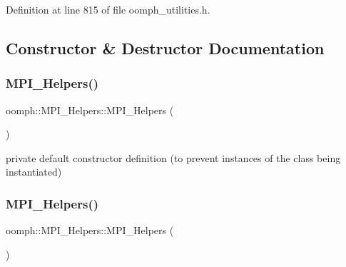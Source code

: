 Definition at line 815 of file oomph\+\_\+utilities.\+h.



\subsection{Constructor \& Destructor Documentation}
\mbox{\label{classoomph_1_1MPI__Helpers_afb01ddfbe038936ec832cdbea6e677e8}} 
\subsubsection{\texorpdfstring{M\+P\+I\+\_\+\+Helpers()}{MPI\_Helpers()}\hspace{0.1cm}{\footnotesize\ttfamily [1/2]}}
{\footnotesize\ttfamily oomph\+::\+M\+P\+I\+\_\+\+Helpers\+::\+M\+P\+I\+\_\+\+Helpers (\begin{DoxyParamCaption}{ }\end{DoxyParamCaption})\hspace{0.3cm}{\ttfamily [private]}}



private default constructor definition (to prevent instances of the class being instantiated) 

\mbox{\label{classoomph_1_1MPI__Helpers_acf521b68d094e6a88a8bf14f8ebe3185}} 
\subsubsection{\texorpdfstring{M\+P\+I\+\_\+\+Helpers()}{MPI\_Helpers()}\hspace{0.1cm}{\footnotesize\ttfamily [2/2]}}
{\footnotesize\ttfamily oomph\+::\+M\+P\+I\+\_\+\+Helpers\+::\+M\+P\+I\+\_\+\+Helpers (\begin{DoxyParamCaption}\item[{const \hyperlink{classoomph_1_1MPI__Helpers}{M\+P\+I\+\_\+\+Helpers} \&}]{ }\end{DoxyParamCaption})\hspace{0.3cm}{\ttfamily [private]}}



